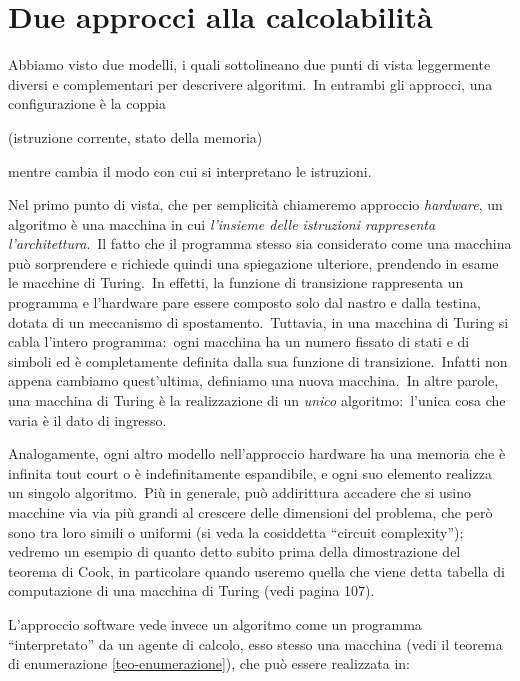 \section{Due approcci alla calcolabilità}

Abbiamo visto due modelli, i quali sottolineano due punti di vista leggermente diversi e complementari per descrivere algoritmi.\
In entrambi gli approcci, una configurazione è la coppia

\begin{center}
    (istruzione corrente, stato della memoria)
\end{center}

\noindent mentre cambia il modo con cui si interpretano le istruzioni.

Nel primo punto di vista, che per semplicità chiameremo approccio \textit{hardware}, un algoritmo è una macchina in cui \textit{l'insieme delle istruzioni rappresenta l'architettura}.\
Il fatto che il programma stesso sia considerato come una macchina può sorprendere e richiede quindi una spiegazione ulteriore, prendendo in esame le macchine di Turing.\
In effetti, la funzione di transizione rappresenta un programma e l'hardware pare essere composto solo dal nastro e dalla testina, dotata di un meccanismo di spostamento.\
Tuttavia, in una macchina di Turing si cabla l'intero programma:\ ogni macchina ha un numero fissato di stati e di simboli ed è completamente definita dalla sua funzione di transizione.\
Infatti non appena cambiamo quest'ultima, definiamo una nuova macchina.\
In altre parole, una macchina di Turing è la realizzazione di un \textit{unico} algoritmo:\ l'unica cosa che varia è il dato di ingresso.

Analogamente, ogni altro modello nell'approccio hardware ha una memoria che è infinita tout court o è indefinitamente espandibile, e ogni suo elemento realizza un singolo algoritmo.\
Più in generale, può addirittura accadere che si usino macchine via via più grandi al crescere delle dimensioni del problema, che però sono tra loro simili o uniformi (si veda la cosiddetta ``circuit complexity''); vedremo un esempio di quanto detto subito prima della dimostrazione del teorema di Cook, in particolare quando useremo quella che viene detta tabella di computazione di una macchina di Turing (vedi pagina 107).\

L'approccio software vede invece un algoritmo come un programma ``interpretato'' da un agente di calcolo, esso stesso una macchina (vedi il teorema di enumerazione \ref{teo-enumerazione}), che può essere realizzata in:

